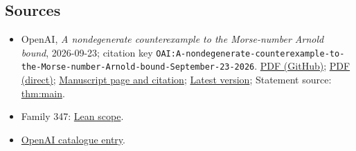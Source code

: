 \documentclass[11pt]{article}
\begin{document}
\subsection{Sources}
\begin{itemize}
\item OpenAI, \emph{A nondegenerate counterexample to the Morse-number Arnold bound}, 2026-09-23; citation key \texttt{OAI:A-nondegenerate-counterexample-to-the-Morse-number-Arnold-bound-September-23-2026}. \href{https://github.com/openai/math/blob/adc7f1241b42e322a6451854ab7e4b4c146bf78a/preprints/A-nondegenerate-counterexample-to-the-Morse-number-Arnold-bound-September-23-2026/paper.pdf}{PDF (GitHub)}; \href{https://github.com/openai/math/raw/adc7f1241b42e322a6451854ab7e4b4c146bf78a/preprints/A-nondegenerate-counterexample-to-the-Morse-number-Arnold-bound-September-23-2026/paper.pdf}{PDF (direct)}; \href{https://github.com/openai/math/blob/adc7f1241b42e322a6451854ab7e4b4c146bf78a/preprints/A-nondegenerate-counterexample-to-the-Morse-number-Arnold-bound-September-23-2026/README.md}{Manuscript page and citation}; \href{https://github.com/openai/math/blob/main/preprints/A-nondegenerate-counterexample-to-the-Morse-number-Arnold-bound-September-23-2026/paper.pdf}{Latest version}; Statement source: \href{https://github.com/openai/math/blob/adc7f1241b42e322a6451854ab7e4b4c146bf78a/preprints/A-nondegenerate-counterexample-to-the-Morse-number-Arnold-bound-September-23-2026/build/sections/01-introduction.tex\#L32}{thm:main}.
\item Family 347: \href{https://github.com/openai/math/blob/adc7f1241b42e322a6451854ab7e4b4c146bf78a/lean/docs/347.md}{Lean scope}.
\item \href{https://github.com/openai/math/blob/adc7f1241b42e322a6451854ab7e4b4c146bf78a/CONTENTS.md}{OpenAI catalogue entry}.
\end{itemize}
\end{document}
